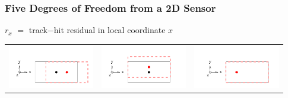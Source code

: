 \documentclass[12pt,compress]{beamer}
\begin{document}
\begin{frame}
\frametitle{Five Degrees of Freedom from a 2D Sensor}

$r_x$ $=$ track$-$hit residual in local coordinate $x$

\vspace{-1 cm}
\begin{center}
\begin{tabular}{p{0.31\linewidth} p{0.31\linewidth} p{0.31\linewidth}}
  \begin{minipage}{\linewidth}
    \includegraphics[width=\linewidth]{dof_x}
  \end{minipage} &
  \begin{minipage}{\linewidth}
    \includegraphics[width=\linewidth]{dof_y}
  \end{minipage} &
  \begin{minipage}{\linewidth}
    \includegraphics[width=\linewidth]{dof_z}

\end{minipage}
\end{tabular}
\end{center}
\end{frame}
\end{document}
